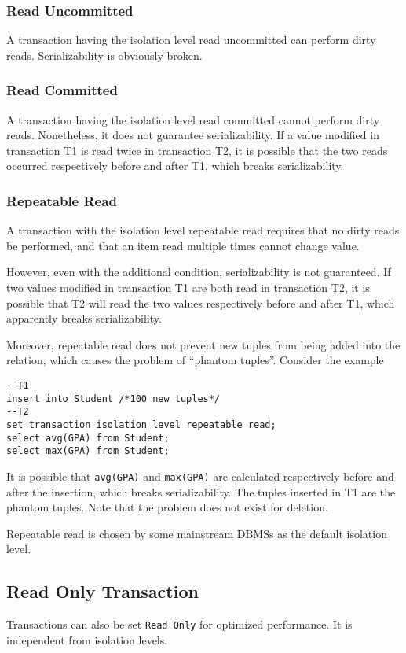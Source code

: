 \subsubsection{Read Uncommitted}
A transaction having the isolation level read uncommitted can perform dirty reads. Serializability is obviously broken. 
\subsubsection{Read Committed}
A transaction having the isolation level read committed cannot perform dirty reads. Nonetheless, it does not guarantee serializability. If a value modified in transaction T1 is read twice in transaction T2, it is possible that the two reads occurred respectively before and after T1, which breaks serializability. 
\subsubsection{Repeatable Read}
A transaction with the isolation level repeatable read requires that no dirty reads be performed, and that an item read multiple times cannot change value. 

However, even with the additional condition, serializability is not guaranteed. If two values modified in transaction T1 are both read in transaction T2, it is possible that T2 will read the two values respectively before and after T1, which apparently breaks serializability.

Moreover, repeatable read does not prevent new tuples from being added into the relation, which causes the problem of ``phantom tuples''. Consider the example
\begin{lstlisting}
--T1
insert into Student /*100 new tuples*/
--T2
set transaction isolation level repeatable read;
select avg(GPA) from Student;
select max(GPA) from Student;
\end{lstlisting} 
It is possible that \texttt{avg(GPA)} and \texttt{max(GPA)} are calculated respectively before and after the insertion, which breaks serializability. The tuples inserted in T1 are the phantom tuples. Note that the problem does not exist for deletion.

Repeatable read is chosen by some mainstream DBMSs as the default isolation level.
\subsection{Read Only Transaction}
Transactions can also be set \texttt{Read Only} for optimized performance. It is independent from isolation levels.
\ifx\PREAMBLE\undefined

\fi